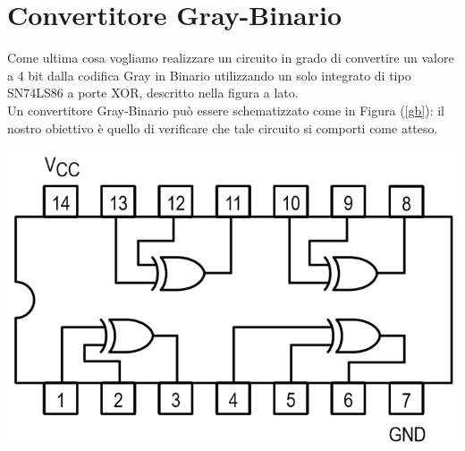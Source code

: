 \documentclass[10pt, a4paper, italian]{article}
\begin{document}
\section{Convertitore Gray-Binario}
\begin{minipage}{0.7\textwidth}
    Come ultima cosa vogliamo realizzare un circuito in grado di convertire un valore a 4 bit dalla codifica Gray in Binario utilizzando un solo integrato di tipo SN74LS86 a porte XOR, descritto nella figura a lato.\\
    Un convertitore Gray-Binario può essere schematizzato come in Figura (\ref{gb}): il nostro obiettivo è quello di verificare che tale circuito si comporti come atteso.
\end{minipage}
\begin{minipage}{0.3\textwidth}
    \includegraphics[width=\textwidth]{XOR.png}
\end{minipage}
\newline
\end{document}
